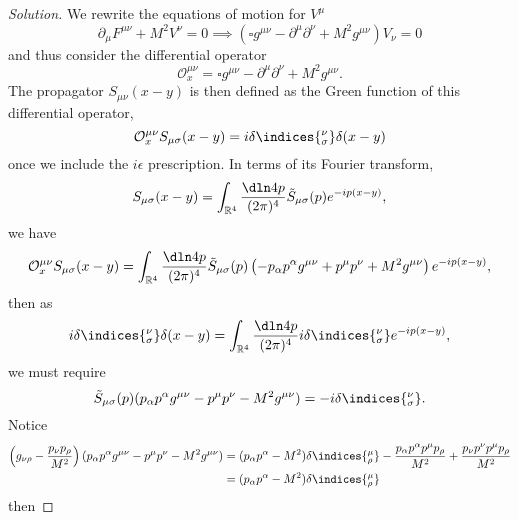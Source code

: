 \begin{proof}[Solution]
   We rewrite the equations of motion for \(V^\mu\) 
   \begin{equation*}
      \partial_\mu F^{\mu\nu} + M^2 V^\nu = 0 \implies \left(\square g^{\mu\nu} - \partial^\mu \partial^\nu + M^2 g^{\mu\nu} \right)V_{\nu} = 0
   \end{equation*}
   and thus consider the differential operator
   \begin{equation*}
      \mathcal{O}_x^{\mu\nu} = \square g^{\mu\nu} - \partial^\mu \partial^\nu + M^2 g^{\mu\nu}.
   \end{equation*}
   The propagator \(S_{\mu\nu}(x - y)\) is then defined as the Green function of this differential operator,
   \begin{equation*}
      \mathcal{O}_x^{\mu\nu}S_{\mu\sigma}(x - y) = i\delta\indices{^\nu_\sigma} \delta(x - y)
   \end{equation*}
   once we include the \(i \epsilon\) prescription. In terms of its Fourier transform,
   \begin{equation*}
      S_{\mu\sigma}(x - y) = \int_{\mathbb{R}^4} \frac{\dln4p}{(2\pi)^4} \tilde{S}_{\mu\sigma}(p) e^{-ip(x-y)},
   \end{equation*}
   we have
   \begin{equation*}
      \mathcal{O}_x^{\mu\nu} S_{\mu\sigma}(x - y) = \int_{\mathbb{R}^4} \frac{\dln4p}{(2\pi)^4} \tilde{S}_{\mu\sigma}(p) \left(-p_\alpha p^\alpha g^{\mu\nu} + p^\mu p^\nu + M^2 g^{\mu\nu}\right) e^{-ip(x - y)},
   \end{equation*}
   then as
   \begin{equation*}
      i \delta\indices{^\nu_\sigma} \delta(x - y) = \int_{\mathbb{R}^4} \frac{\dln4p}{(2\pi)^4} i \delta\indices{^\nu_\sigma} e^{-ip(x - y)},
   \end{equation*}
   we must require
   \begin{equation*}
      \tilde{S}_{\mu\sigma}(p) (p_\alpha p^\alpha g^{\mu\nu} - p^\mu p^\nu - M^2 g^{\mu\nu}) = -i \delta\indices{^\nu_\sigma}.
   \end{equation*}
   Notice
   \begin{align*}
      \left(g_{\nu \rho} - \frac{p_\nu p_\rho}{M^2}\right) (p_\alpha p^\alpha g^{\mu\nu} - p^\mu p^\nu - M^2 g^{\mu\nu}) 
      &= (p_\alpha p^\alpha - M^2)\delta\indices{^\mu_\rho} - \frac{p_\alpha p^\alpha p^\mu p_\rho}{M^2} + \frac{p_\nu p^\nu p^\mu p_\rho}{M^2}\\
      &= (p_\alpha p^\alpha - M^2) \delta\indices{^\mu_\rho} 
   \end{align*}
   then

\end{proof}
